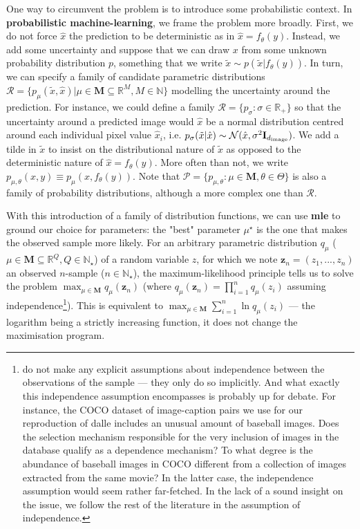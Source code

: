 \documentclass{article}
\begin{document}
\begin{multicols}{2}
One way to circumvent the problem is to introduce some probabilistic context. In \textbf{probabilistic machine-learning}, we frame the problem more broadly. First, we do not force $\hat x$ the prediction to be deterministic as in $\hat x=f_\theta(y)$. Instead, we add some uncertainty and suppose that we can draw $x$ from some unknown probability distribution $p$, something that we write $\tilde x \sim p(\tilde x|f_\theta(y))$. In turn, we can specify a family of candidate parametric distributions $\mathcal{R}=\{p_\mu(\tilde x, \hat x)|\mu \in \mathbf{M}\subseteq \mathbb{R}^M, M\in\mathbb{N}\}$ modelling the uncertainty around the prediction. For instance, we could define a family $\mathcal{R}=\{p_\sigma:\sigma \in \mathbb{R}_+\}$ so that the uncertainty around a predicted image would $\hat x$ be a normal distribution centred around each individual pixel value $\hat x_i$, i.e. $p_{\sigma}(\tilde x | \hat x)\sim 
\mathcal{N}(\hat x, \sigma^2 \mathbf{I}_{d_{\mathrm{image}}})$. We add a tilde in $\tilde x$ to insist on the distributional nature of $\tilde x$ as opposed to the deterministic nature of $\hat x=f_\theta(y)$. More often than not, we write $p_{\mu,\theta}(x,y)\equiv p_\mu(x, f_\theta(y))$. Note that $\mathcal{P}=\{p_{\mu,\theta}:\mu \in\mathbf{M},\theta\in\Theta\}$ is also a family of probability distributions, although a more complex one than $\mathcal{R}$.

With this introduction of a family of distribution functions, we can use \textbf{\gls{mle}} to ground our choice for parameters: the "best" parameter $\mu^\star$ is the one that makes the observed sample more likely. For an arbitrary parametric distribution $q_\mu$ ($\mu \in \mathbf{M} \subseteq \mathbb{R}^Q, Q \in \mathbb{N}_\star$) of a random variable $z$, for which we note $\mathbf{z}_n=(z_1, ..., z_n)$ an observed $n$-sample ($n \in \mathbb{N}_\star$), the maximum-likelihood principle tells us to solve the problem $\max_{\mu \in \mathbf{M}} q_\mu(\mathbf{z}_n)$ (where $q_\mu(\mathbf{z}_n)=\prod_{i=1}^nq_\mu(z_i)$ assuming independence\footnote{\citet{zeroshot} do not make any explicit assumptions about independence between the observations of the sample — they only do so implicitly. And what exactly this independence assumption encompasses is probably up for debate. For instance, the COCO dataset of image-caption pairs we use for our reproduction of \gls{dalle} includes an unusual amount of baseball images. Does the selection mechanism responsible for the very inclusion of images in the database qualify as a dependence mechanism? To what degree is the abundance of baseball images in COCO different from a collection of images extracted from the same movie? In the latter case, the independence assumption would seem rather far-fetched. In the lack of a sound insight on the issue, we follow the rest of the literature in the assumption of independence.}). This is equivalent to $\max_{\mu \in \mathbf{M}} \sum_{i=1}^n \ln q_\mu(z_i)$ — the logarithm being a strictly increasing function, it does not change the maximisation program.


\end{multicols}
\end{document}
